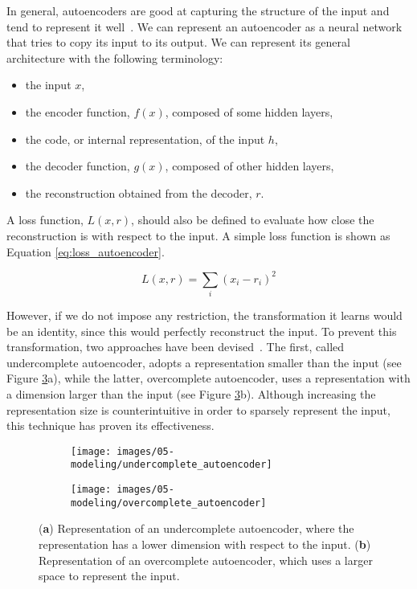 In general, autoencoders are good at capturing the structure of the input and tend to represent it well~\cite{goodfellow_deep_2016}. We can represent an autoencoder as a neural network that tries to copy its input to its output. We can represent its general architecture with the following terminology:
\begin{itemize}[leftmargin=*,labelsep=5.8mm]
	\item the input $x$,
  \item the {encoder function}, $f(x)$, composed of some hidden layers,
  \item the {code}, or internal representation, of the input $h$,
  \item the {decoder function}, $g(x)$, composed of other hidden layers,
  \item the reconstruction obtained from the decoder, $r$.
\end{itemize}

A {loss function}, $L(x, r)$, should also be defined to evaluate how close the reconstruction is with respect to the input.
A simple loss function is shown as Equation \eqref{eq:loss_autoencoder}.

\begin{equation} \label{eq:loss_autoencoder}
L(x,r) = \sum_{i} (x_i - r_i)^2
\end{equation}

However, if we do not impose any restriction, the transformation it learns would be an identity, since this would perfectly reconstruct the input. To prevent this transformation, two approaches have been devised~\cite{goodfellow_deep_2016}.
The first, called {undercomplete autoencoder}, adopts a representation smaller than the input (see Figure \ref{fig:under_over_autoencoder}a),
while the latter, {overcomplete autoencoder}, uses a representation with a dimension larger than the input (see Figure \ref{fig:under_over_autoencoder}b).
Although increasing the representation size is counterintuitive in order to sparsely represent the input, this technique has proven its effectiveness.

\begin{figure}[H]
\centering
\begin{subfigure}[H]{0.3\textwidth}
\centering
\texttt{[image: images/05-modeling/undercomplete\_autoencoder]}
\caption{}
\label{figure:undercomplete}
\end{subfigure}
\begin{subfigure}[H]{0.3\textwidth}
\centering
\texttt{[image: images/05-modeling/overcomplete\_autoencoder]}
\caption{}
\label{figure:overcomplete}
\end{subfigure}  \vspace{-6pt}
\caption{(\textbf{a}) Representation of an undercomplete autoencoder, where the representation has a lower dimension with respect to the input. (\textbf{b}) Representation of an overcomplete autoencoder, which uses a larger space to represent the input.}
\label{fig:under_over_autoencoder}
\end{figure}

